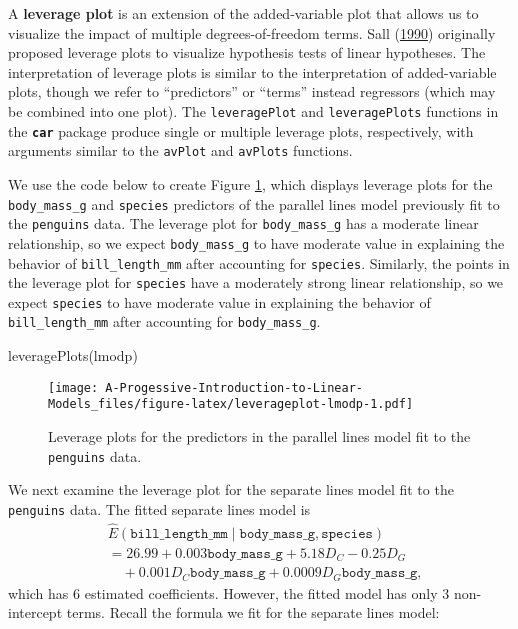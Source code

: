 \documentclass[
]{book}
\newenvironment{Shaded}{\begin{snugshade}}{\end{snugshade}}
\newcommand{\FunctionTok}[1]{\textcolor[rgb]{0.00,0.00,0.00}{#1}}
\newcommand{\NormalTok}[1]{#1}
\theoremstyle{definition}
\theoremstyle{definition}
\theoremstyle{definition}
\theoremstyle{definition}
\theoremstyle{remark}
\begin{document}
A \textbf{leverage plot} is an extension of the added-variable plot that
allows us to visualize the impact of multiple degrees-of-freedom terms.
Sall (\protect\hyperlink{ref-sall1990leverage}{1990}) originally proposed leverage plots to visualize
hypothesis tests of linear hypotheses. The interpretation of leverage
plots is similar to the interpretation of added-variable plots, though
we refer to ``predictors'' or ``terms'' instead regressors (which may be
combined into one plot). The \texttt{leveragePlot} and \texttt{leveragePlots}
functions in the \textbf{\texttt{car}} package produce single or multiple leverage
plots, respectively, with arguments similar to the \texttt{avPlot} and
\texttt{avPlots} functions.

We use the code below to create Figure \ref{fig:leverageplot-lmodp},
which displays leverage plots for the \texttt{body\_mass\_g} and \texttt{species}
predictors of the parallel lines model previously fit to the \texttt{penguins}
data. The leverage plot for \texttt{body\_mass\_g} has a moderate linear
relationship, so we expect \texttt{body\_mass\_g} to have moderate value in
explaining the behavior of \texttt{bill\_length\_mm} after accounting for
\texttt{species}. Similarly, the points in the leverage plot for \texttt{species} have
a moderately strong linear relationship, so we expect \texttt{species} to have
moderate value in explaining the behavior of \texttt{bill\_length\_mm} after
accounting for \texttt{body\_mass\_g}.

\begin{Shaded}
\begin{Highlighting}[]
\FunctionTok{leveragePlots}\NormalTok{(lmodp)}
\end{Highlighting}
\end{Shaded}

\begin{figure}
\centering
\texttt{[image: A-Progessive-Introduction-to-Linear-Models\_files/figure-latex/leverageplot-lmodp-1.pdf]}
\caption{\label{fig:leverageplot-lmodp}Leverage plots for the predictors in the parallel lines model fit to the \texttt{penguins} data.}
\end{figure}

We next examine the leverage plot for the separate lines model fit to
the \texttt{penguins} data. The fitted separate lines model is\[
\begin{aligned}
&\hat{E}(\mathtt{bill\_length\_mm} \mid \mathtt{body\_mass\_g}, \mathtt{species}) \\
&= 26.99 + 0.003 \mathtt{body\_mass\_g} + 5.18 D_C - 0.25 D_G \\
&\quad + 0.001 D_C \mathtt{body\_mass\_g} + 0.0009 D_G \mathtt{body\_mass\_g},
\end{aligned}
\]which has 6 estimated coefficients. However, the fitted model has only
3 non-intercept terms. Recall the formula we fit for the separate lines
model:
\end{document}
